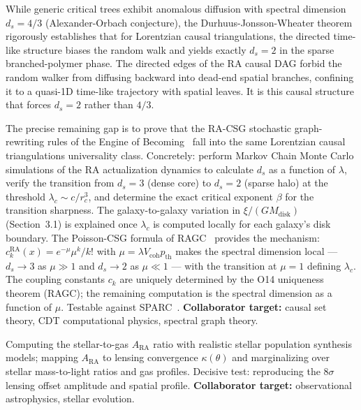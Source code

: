 \documentclass[11pt,a4paper]{article}
\theoremstyle{plain}
\theoremstyle{definition}
\theoremstyle{remark}
\newcommand{\ARA}{A_{\mathrm{RA}}}
\begin{document}
\begin{description}
  While generic critical trees exhibit anomalous diffusion with spectral
  dimension $d_s = 4/3$ (Alexander-Orbach conjecture), the
  Durhuus-Jonsson-Wheater theorem rigorously establishes that for
  Lorentzian causal triangulations, the directed time-like structure biases
  the random walk and yields exactly $d_s = 2$ in the sparse
  branched-polymer phase. The directed edges of the RA causal DAG forbid the
  random walker from diffusing backward into dead-end spatial branches,
  confining it to a quasi-1D time-like trajectory with spatial leaves. It is
  this causal structure that forces $d_s = 2$ rather than $4/3$.

  The precise remaining gap is to prove that the RA-CSG stochastic
  graph-rewriting rules of the Engine of
  Becoming~\citep{Sandeman2026RAEB} fall into the same Lorentzian causal
  triangulations universality class. Concretely: perform Markov Chain Monte
  Carlo simulations of the RA actualization dynamics to calculate $d_s$ as a
  function of $\lambda$, verify the transition from $d_s = 3$ (dense core)
  to $d_s = 2$ (sparse halo) at the threshold $\lambda_c \sim c/r_c^3$, and
  determine the exact critical exponent $\beta$ for the transition sharpness.
  The galaxy-to-galaxy variation in $\xi/(GM_{\mathrm{disk}})$ (Section~3.1)
  is explained once $\lambda_c$ is computed locally for each galaxy's disk
  boundary. The Poisson-CSG formula of RAGC~\citep{Sandeman2026b} provides the
  mechanism: $c_k^{\mathrm{RA}}(x) = e^{-\mu}\mu^k/k!$ with
  $\mu = \lambda V_{\mathrm{coh}} p_{\mathrm{th}}$ makes the spectral
  dimension local --- $d_s \to 3$ as $\mu \gg 1$ and $d_s \to 2$ as
  $\mu \ll 1$ --- with the transition at $\mu = 1$ defining $\lambda_c$.
  The coupling constants $c_k$ are uniquely determined by the O14
  uniqueness theorem (RAGC); the remaining computation is the
  spectral dimension as a function of $\mu$. Testable against
  SPARC~\citep{Lelli2016}.
  \textbf{Collaborator target:} causal set theory, CDT computational
  physics, spectral graph theory.

  \item[Hard Wall 3: Quantitative Bullet Cluster.] Computing the stellar-to-gas
  $\ARA$ ratio with realistic stellar population synthesis models; mapping $\ARA$
  to lensing convergence $\kappa(\theta)$ and marginalizing over stellar
  mass-to-light ratios and gas profiles. Decisive test: reproducing the $8\sigma$
  lensing offset amplitude and spatial profile.
  \textbf{Collaborator target:} observational astrophysics, stellar evolution.


\end{description}
\end{document}
